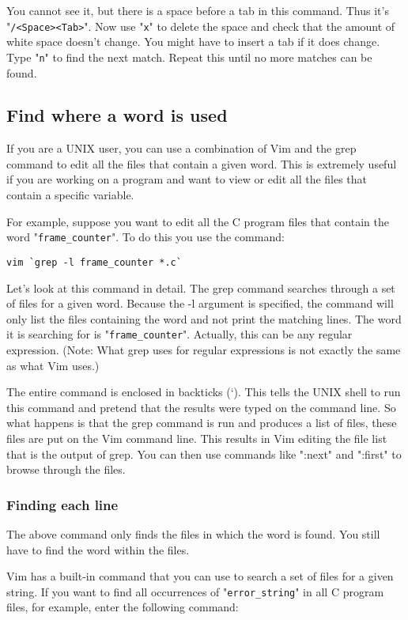 You cannot see it, but there is a space before a tab in this command.
Thus it's "\verb!/<Space><Tab>!".
Now use "\verb!x!" to delete the space and check that the amount of white space doesn't change.
You might have to insert a tab if it does change.
Type "\verb!n!" to find the next match.
Repeat this until no more matches can be found.
\subsection{Find where a word is used}
If you are a UNIX user, you can use a combination of Vim and the grep command to edit all the files that contain a given word.
This is extremely useful if you are working on a program and want to view or edit all the files that contain a specific variable.

For example, suppose you want to edit all the C program files that contain the word "\verb!frame_counter!".
To do this you use the command:

\begin{Verbatim}[samepage=true]
 vim `grep -l frame_counter *.c`
\end{Verbatim}

Let's look at this command in detail.
The grep command searches through a set of files for a given word.
Because the -l argument is specified, the command will only list the files containing the word and not print the matching lines.
The word it is searching for is "\verb!frame_counter!".
Actually, this can be any regular expression.
(Note: What grep uses for regular expressions is not exactly the same as what Vim uses.)

The entire command is enclosed in backticks (`).
This tells the UNIX shell to run this command and pretend that the results were typed on the command line.
So what happens is that the grep command is run and produces a list of files, these files are put on the Vim command line.
This results in Vim editing the file list that is the output of grep.
You can then use commands like ":next" and ":first" to browse through the files.

\subsubsection{Finding each line}
The above command only finds the files in which the word is found.
You still have to find the word within the files.

Vim has a built-in command that you can use to search a set of files for a given string.
If you want to find all occurrences of "\verb!error_string!" in all C program files, for example, enter the following command:


